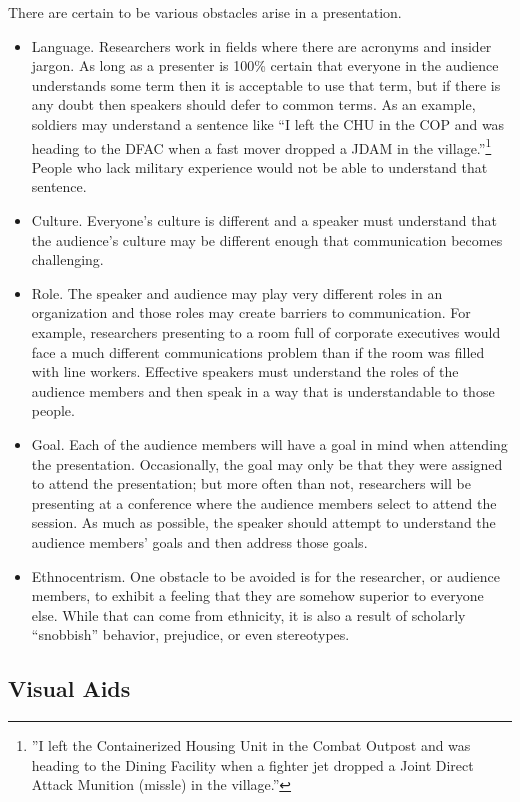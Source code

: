 There are certain to be various obstacles arise in a presentation.

\begin{itemize}
	\item Language. Researchers work in fields where there are acronyms and insider jargon. As long as a presenter is 100\% certain that everyone in the audience understands some term then it is acceptable to use that term, but if there is any doubt then speakers should defer to common terms. As an example, soldiers may understand a sentence like ``I left the CHU in the COP and was heading to the DFAC when a fast mover dropped a JDAM in the village.''{\footnote{''I left the Containerized Housing Unit in the Combat Outpost and was heading to the Dining Facility when a fighter jet dropped a Joint Direct Attack Munition (missle) in the village.''}} People who lack military experience would not be able to understand that sentence.
	\item Culture. Everyone's culture is different and a speaker must understand that the audience's culture may be different enough that communication becomes challenging.
	\item Role. The speaker and audience may play very different roles in an organization and those roles may create barriers to communication. For example, researchers presenting to a room full of corporate executives would face a much different communications problem than if the room was filled with line workers. Effective speakers must understand the roles of the audience members and then speak in a way that is understandable to those people.
	\item Goal. Each of the audience members will have a goal in mind when attending the presentation. Occasionally, the goal may only be that they were assigned to attend the presentation; but more often than not, researchers will be presenting at a conference where the audience members select to attend the session. As much as possible, the speaker should attempt to understand the audience members' goals and then address those goals.
	\item Ethnocentrism. One obstacle to be avoided is for the researcher, or audience members, to exhibit a feeling that they are somehow superior to everyone else. While that can come from ethnicity, it is also a result of scholarly ``snobbish'' behavior, prejudice, or even stereotypes.
\end{itemize}

\subsection{Visual Aids}


